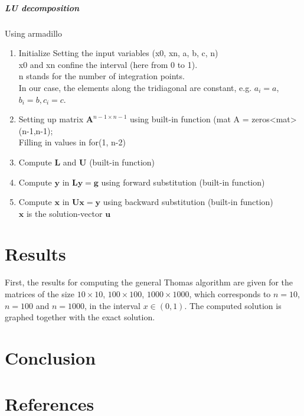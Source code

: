 \documentclass[%
oneside,                 %
final,                   %
10pt]{article}
\begin{document}
\subparagraph{LU decomposition}
Using armadillo
\begin{enumerate}
\item Initialize Setting the input variables (x0, xn, a, b, c, n) \\
	x0 and xn confine the interval (here from 0 to 1). \\
	n stands for the number of integration points. \\
	In our case, the elements along the tridiagonal are constant, e.g. $a_i=a$, $b_i=b, c_i=c$.

\item Setting up matrix $\mathbf{A}^{n-1 \times n-1}$ using built-in function (mat A = zeros<mat>(n-1,n-1);\\
	 Filling in values in for(1,
		n-2)

\item Compute $\mathbf{L}$ and $\mathbf{U}$ (built-in function)

\item Compute $\mathbf{y}$ in $\mathbf{Ly}=\mathbf{g}$ using forward substitution (built-in function)

\item Compute $\mathbf{x}$ in $\mathbf{Ux}=\mathbf{y}$ using backward substitution (built-in function)\\
		$\mathbf{x}$ is the solution-vector $\mathbf{u}$
\end{enumerate}
\section{Results}
First, the results for computing the general Thomas algorithm are given for the matrices of the size $10 \times 10$, $100 \times 100$, $1000 \times 1000$, which corresponds to $n=10$, $n=100$ and $n=1000$, in the interval $x \in (0,1)$. The computed solution is graphed together with the exact solution.

\section{Conclusion}
\section{References}











\end{document}

